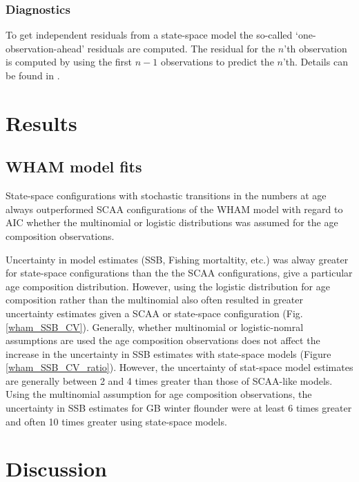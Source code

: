 \documentclass[12pt,letterpaper, leqno]{article}
\begin{document}
\subsubsection*{Diagnostics}

To get independent residuals from a state-space model the so-called `one-observation-ahead' residuals are computed. The residual for the $n$'th observation is computed by using the first $n-1$ observations to predict the $n$'th. Details can be found in \citet{thygesen2017validation}.   

\section*{Results}

\subsection*{WHAM model fits}

State-space configurations with stochastic transitions in the numbers at age always outperformed SCAA configurations of the WHAM model with regard to AIC whether the multinomial or logistic distributions was assumed for the age composition observations. 

Uncertainty in model estimates (SSB, Fishing mortaltity, etc.) was alway greater for state-space configurations than the the SCAA configurations, give a particular age composition distribution. However, using the logistic distribution for age composition rather than the multinomial also often resulted in greater uncertainty estimates given a SCAA or state-space configuration (Fig. \ref{wham_SSB_CV}). Generally, whether multinomial or logistic-nomral assumptions are used the age composition observations does not affect the increase in the uncertainty in SSB estimates with state-space models  (Figure \ref{wham_SSB_CV_ratio}). However, the uncertainty of stat-space model estimates are generally between 2 and 4 times greater than those of SCAA-like models. Using the multinomial assumption for age composition observations, the uncertainty in SSB estimates for GB winter flounder were at least 6 times greater and often 10 times greater using state-space models.

\section*{Discussion}

\clearpage


\end{document}
